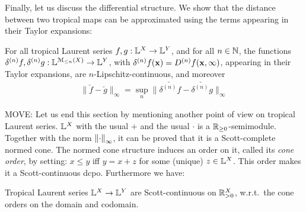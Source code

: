 Finally, let us discuss the differential structure. We show that the distance between two tropical maps can be approximated using the terms appearing in their Taylor expansions:
\begin{proposition}
For all tropical Laurent series $f,g: \mathbb{L}^{X}\to \mathbb{L}^{Y}$, and for all $n\in \mathbb{N}$, 
the functions
$\delta^{(n)}f, \delta^{(n)}g: \mathbb{L}^{\mathcal{M}_{\leq n}(X)}\to \mathbb{L} ^{Y}$, with 
 $\delta^{(n)}f(\B x)= \Der^{(n)}f(\B x, \infty)$, appearing in their Taylor expansions, are $n$-Lipschitz-continuous, and moreover 
\begin{align}
\| \check f-\check g\|_{\infty}= \sup_{n} \| \check{\delta^{(n)}f}- \check{\delta^{(n)}g}\|_{\infty}
\end{align}
\end{proposition} 




{\color{red}MOVE:
Let us end this section by mentioning another point of view on tropical Laurent series.
$\mathbb{L}^X$ with the usual $+$ and the usual $\cdot$ is a $\mathbb{R}_{\geq0}$-semimodule.
Together with the norm $\left\lVert\cdot\right\rVert_\infty$, it can be proved that it is a Scott-complete normed cone.
The normed cone structure induces an order on it, called its \emph{cone order}, by setting:
$x\leq y$ iff $y=x+z$ for some (unique) $z\in\mathbb{L}^X$.
This order makes it a Scott-continuous dcpo.
Furthermore we have:

\begin{proposition}
  Tropical Laurent series $\mathbb{L}^X\to\mathbb{L}^Y$ are Scott-continuous on $\mathbb{R}_{>0}^X$, w.r.t.\ the cone orders on the domain and codomain.
\end{proposition}
}
